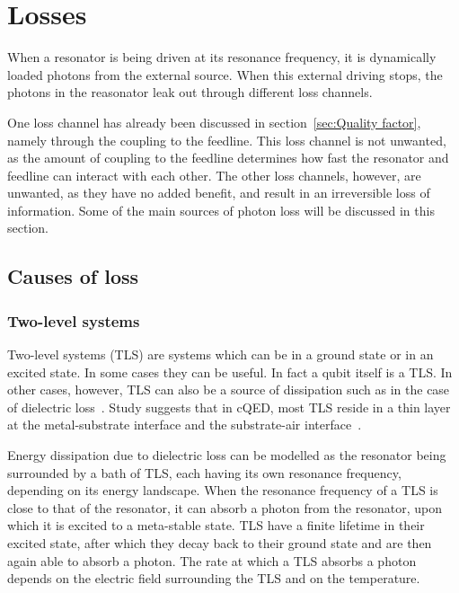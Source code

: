   \section{Losses}
    \label{sec:Losses}

      When a resonator is being driven at its resonance frequency, it is dynamically loaded photons from the external source. When this external driving stops, the photons in the reasonator leak out through different loss channels.

      One loss channel has already been discussed in section~\ref{sec:Quality factor}, namely through the coupling to the feedline. This loss channel is not unwanted, as the amount of coupling to the feedline determines how fast the resonator and feedline can interact with each other. The other loss channels, however, are unwanted, as they have no added benefit, and result in an irreversible loss of information. Some of the main sources of photon loss will be discussed in this section.

  \subsection{Causes of loss}

    \subsubsection{Two-level systems}
      \label{sec:TLS}

      Two-level systems (TLS) are systems which can be in a ground state or in an excited state. In some cases they can be useful. In fact a qubit itself is a TLS. In other cases, however, TLS can also be a source of dissipation such as in the case of dielectric loss~\cite{martinis2014ucsb}. Study suggests that in cQED, most TLS reside in a thin layer at the metal-substrate interface and the substrate-air interface~\cite{wenner2011surface}.

      Energy dissipation due to dielectric loss can be modelled as the resonator being surrounded by a bath of TLS, each having its own resonance frequency, depending on its energy landscape. When the resonance frequency of a TLS is close to that of the resonator, it can absorb a photon from the resonator, upon which it is excited to a meta-stable state. TLS have a finite lifetime in their excited state, after which they decay back to their ground state and are then again able to absorb a photon. The rate at which a TLS absorbs a photon depends on the electric field surrounding the TLS and on the temperature.

